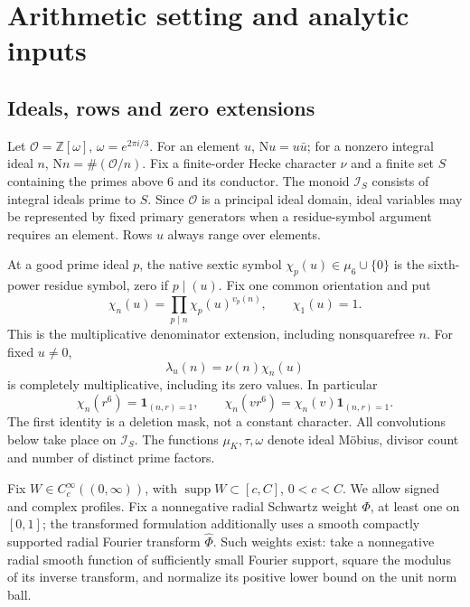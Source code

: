 \documentclass[11pt]{article}
\numberwithin{equation}{section}
\theoremstyle{definition}
\theoremstyle{remark}
\newcommand{\N}{\mathrm N}
\newcommand{\OO}{\mathcal O}
\newcommand{\muK}{\mu_K}
\newcommand{\ind}{\mathbf 1}
\newcommand{\good}{\mathcal I_S}
\begin{document}
\section{Arithmetic setting and analytic inputs}\label{sec:setting}

\subsection{Ideals, rows and zero extensions}

Let \(\OO=\mathbb Z[\omega]\), \(\omega=e^{2\pi i/3}\).
For an element \(u\), \(\N u=u\bar u\); for a nonzero integral
ideal \(n\), \(\N n=\#(\OO/n)\).
Fix a finite-order Hecke character \(\nu\) and a finite set \(S\)
containing the primes above \(6\) and its conductor.
The monoid \(\good\) consists of integral ideals prime to \(S\).
Since \(\OO\) is a principal ideal domain, ideal variables may be
represented by fixed primary generators when a residue-symbol
argument requires an element. Rows \(u\) always range over elements.

At a good prime ideal \(p\), the native sextic symbol
\(\chi_p(u)\in\mu_6\cup\{0\}\) is the sixth-power residue symbol,
zero if \(p\mid(u)\). Fix one common orientation and put
\[
 \chi_n(u)=\prod_{p\mid n}\chi_p(u)^{v_p(n)},\qquad
 \chi_1(u)=1.
\]
This is the multiplicative denominator extension, including
nonsquarefree \(n\).
For fixed \(u\ne0\),
\begin{equation}\label{eq:lambda}
 \lambda_u(n)=\nu(n)\chi_n(u)
\end{equation}
is completely multiplicative, including its zero values.
In particular
\begin{equation}\label{eq:power-mask}
 \chi_n(r^6)=\ind_{(n,r)=1},\qquad
 \chi_n(vr^6)=\chi_n(v)\ind_{(n,r)=1}.
\end{equation}
The first identity is a deletion mask, not a constant character.
All convolutions below take place on \(\good\).
The functions \(\muK,\tau,\omega\) denote ideal M\"obius, divisor
count and number of distinct prime factors.

Fix \(W\in C_c^\infty((0,\infty))\), with
\(\operatorname{supp}W\subset[c,C]\), \(0<c<C\).
We allow signed and complex profiles.
Fix a nonnegative radial Schwartz weight \(\Phi\), at least one on
\([0,1]\); the transformed formulation additionally uses a smooth
compactly supported radial Fourier transform \(\widehat\Phi\).
Such weights exist: take a nonnegative radial smooth function of
sufficiently small Fourier support, square the modulus of its inverse
transform, and normalize its positive lower bound on the unit norm ball.
\end{document}
